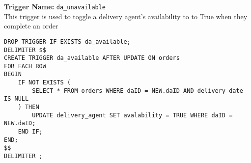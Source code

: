 \textbf{Trigger Name:} \texttt{da\_unavailable} \\
This trigger is used to toggle a delivery agent's availability to to True when they complete an order

\begin{lstlisting}
DROP TRIGGER IF EXISTS da_available;
DELIMITER $$
CREATE TRIGGER da_available AFTER UPDATE ON orders
FOR EACH ROW
BEGIN
    IF NOT EXISTS (
        SELECT * FROM orders WHERE daID = NEW.daID AND delivery_date IS NULL
    ) THEN
        UPDATE delivery_agent SET avalability = TRUE WHERE daID = NEW.daID;
    END IF;
END;
$$
DELIMITER ;
\end{lstlisting}